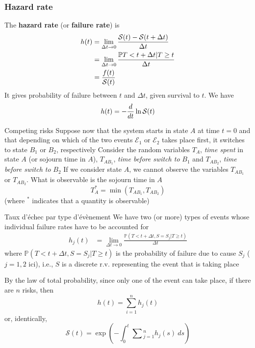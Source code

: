 \documentclass[aspectratio=169]{beamer}
\begin{document}
\begin{frame}\frametitle{Hazard rate}
The \textbf{hazard rate} (or \textbf{failure rate}) is
\begin{align*}
h(t) &= \lim_{\Delta t\to 0}\frac{\S(t)-\S(t+\Delta t)}{\Delta t} \\
& = \lim_{\Delta t\to 0} \frac{\IP{ T<t+\Delta t | T\geq
t}}{\Delta t} \\
&= \frac{f(t)}{\S(t)}
\end{align*}
It gives probability of failure between $t$ and $\Delta t$, given survival to $t$.
\vfill
We have
\[
h(t)=-\frac{d}{dt}\ln\S(t)
\]
\end{frame}

\begin{frame}{Competing risks}
Suppose now that the system starts in state $A$ at time $t=0$ and that depending on which of the two events $\mathcal{E}_1$ or $\mathcal{E}_2$ takes place first, it switches to state $B_1$ or $B_2$, respectively
\vfill
Consider the random variables $T_A$, \emph{time spent} in state $A$ (or sojourn time in $A$), $T_{AB_1}$, \emph{time before switch to} $B_1$ and $T_{AB_2}$, \emph{time before switch to} $B_2$
\vfill
If we consider state $A$, we cannot observe the variables $T_{AB_1}$ or $T_{AB_2}$. What is observable is the sojourn time in $A$
\[
T^*_A=\min\left( T_{AB_1},T_{AB_2} \right)
\]
(where $^*$ indicates that a quantity is observable)
\end{frame}

\begin{frame}{Taux d'échec par type d'évènement}
We have two (or more) types of events whose individual failure rates have to be accounted for
\begin{align*}
h_j(t) &= \lim_{\Delta t\to 0} \frac{\mathbb{P}( T<t+\Delta t, S=S_j | T\geq t)}{\Delta t} 
\end{align*}
where $\mathbb{P}(T<t+\Delta t, S=S_j | T\geq t)$ is the probability of failure due to cause $S_j$ ($j=1,2$ ici), i.e., $S$ is a discrete r.v. representing the event that is taking place
\end{frame}

\begin{frame}
By the law of total probability, since only one of the event can take place, if there are $n$ risks, then
$$
h(t) = \sum_{i=1}^n h_j(t)
$$
or, identically,
$$
\mathcal{S}(t)
=
\exp\left(
  -\int_0^t \sum\textstyle_{j=1}^n h_j(s)\ ds
\right)
$$
\end{frame}
\end{document}
